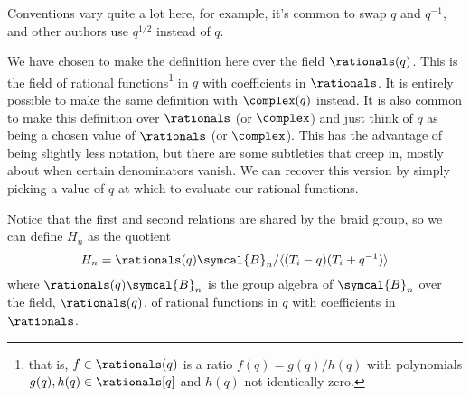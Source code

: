 \documentclass[fleqn]{NotesClass}
\newcommand{\braid}{\symcal{B}}
\begin{document}
    \begin{wrn}
        Conventions vary quite a lot here, for example, it's common to swap \(q\) and \(q^{-1}\), and other authors use \(q^{1/2}\) instead of \(q\).
    \end{wrn}
    
    \begin{remark}{}{}
        We have chosen to make the definition here over the field \(\rationals(q)\).
        This is the field of rational functions\footnote{that is, \(f \in \rationals(q)\) is a ratio \(f(q) = g(q)/h(q)\) with polynomials \(g(q), h(q) \in \rationals[q]\) and \(h(q)\) not identically zero.} in \(q\) with coefficients in \(\rationals\).
        It is entirely possible to make the same definition with \(\complex(q)\) instead.
        It is also common to make this definition over \(\rationals\) (or \(\complex\)) and just think of \(q\) as being a chosen value of \(\rationals\) (or \(\complex\)).
        This has the advantage of being slightly less notation, but there are some subtleties that creep in, mostly about when certain denominators vanish.
        We can recover this version by simply picking a value of \(q\) at which to evaluate our rational functions.
    \end{remark}
    
    Notice that the first and second relations are shared by the braid group, so we can define \(H_n\) as the quotient
    \begin{equation}
        H_n = \rationals(q)\braid_n / \langle (T_i - q)(T_i + q^{-1}) \rangle
    \end{equation}
    where \(\rationals(q)\braid_n\) is the group algebra of \(\braid_n\) over the field, \(\rationals(q)\), of rational functions in \(q\) with coefficients in \(\rationals\).
    
\end{document}
